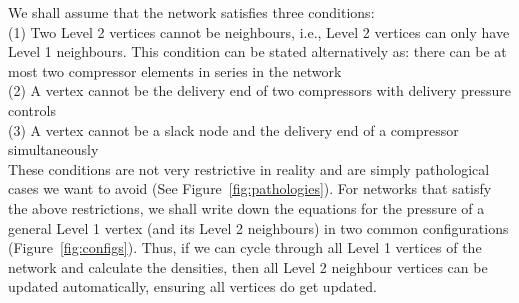 \documentclass{amsart}
\begin{document}
We shall assume that the network satisfies three conditions: \\
(1) Two Level 2 vertices cannot be neighbours, i.e., Level 2 vertices can only have Level 1 neighbours. This condition can be stated  alternatively as: there can be at most two compressor elements in series in the network \\
(2) A vertex cannot be the delivery end of two  compressors with delivery pressure controls \\
(3) A vertex cannot be a  slack node and the delivery end of a  compressor simultaneously \\
These conditions are not very restrictive in reality and are simply pathological cases we want to avoid (See Figure~\ref{fig:pathologies}).
For networks that satisfy the above restrictions, we shall write down the equations for the pressure of a  general Level 1 vertex (and its Level 2 neighbours) in two common configurations (Figure~\ref{fig:configs}). Thus, if we can cycle through all Level 1 vertices of the network and calculate the densities, then all Level 2 neighbour vertices can be updated automatically, ensuring all vertices do get updated.
\end{document}
